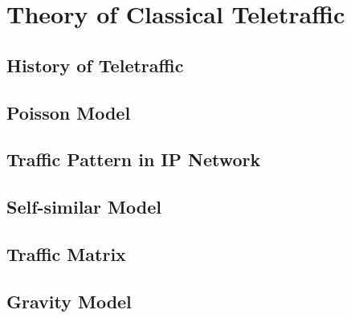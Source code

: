 \chapter{Theory of Classical Teletraffic}
\label{theory_of_classical_teletraffic}

\section{History of Teletraffic}
\section{Poisson Model}
\section{Traffic Pattern in IP Network}
\section{Self-similar Model}
\section{Traffic Matrix}
\section{Gravity Model}

